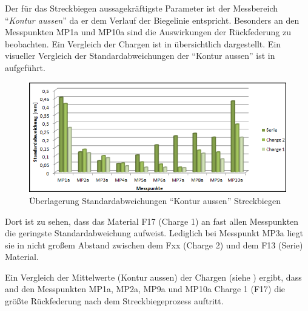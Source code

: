 \documentclass[12pt,a4paper,parskip]{scrartcl}
\begin{document}
Der für das Streckbiegen aussagekräftigste Parameter ist der Messbereich "`\emph{Kontur aussen}"' da er dem Verlauf der Biegelinie entspricht. Besonders an den Messpunkten MP1a und MP10a sind die Auswirkungen der Rückfederung zu beobachten. Ein Vergleich der Chargen ist in  übersichtlich dargestellt. Ein visueller Vergleich der Standardabweichungen der "`Kontur aussen"' ist in  aufgeführt.
\begin{figure}[!htb]
\centering
\includegraphics[width=1\linewidth,height=.3\textheight]{standardstreckb}
\caption{Überlagerung Standardabweichungen "`Kontur aussen"' Streckbiegen}
\label{fig:svstb}
\end{figure}
Dort ist zu sehen, dass das Material F17 (Charge 1) an fast allen Messpunkten die geringste Standardabweichung aufweist. Lediglich bei Messpunkt MP3a liegt sie in nicht großem Abstand zwischen dem Fxx (Charge 2) und dem F13 (Serie) Material.

Ein Vergleich der Mittelwerte (Kontur aussen) der Chargen (siehe  ) ergibt, dass and den Messpunkten MP1a, MP2a, MP9a und MP10a  Charge 1 (F17) die größte Rückfederung nach dem Streckbiegeprozess auftritt.
\end{document}
